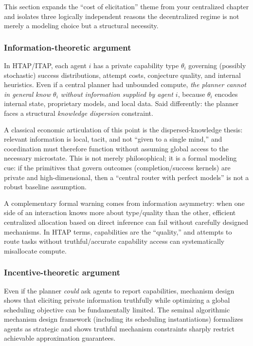 This section expands the ``cost of elicitation'' theme from your centralized chapter and isolates three logically independent reasons the decentralized regime is not merely a modeling choice but a structural necessity.

\subsubsection{Information-theoretic argument}

In HTAP/ITAP, each agent \(i\) has a private capability type \(\theta_i\) governing (possibly stochastic) success distributions, attempt costs, conjecture quality, and internal heuristics. Even if a central planner had unbounded compute, \emph{the planner cannot in general know \(\theta_i\) without information supplied by agent \(i\)}, because \(\theta_i\) encodes internal state, proprietary models, and local data. Said differently: the planner faces a structural \emph{knowledge dispersion} constraint.

A classical economic articulation of this point is the dispersed-knowledge thesis: relevant information is local, tacit, and not ``given to a single mind,'' and coordination must therefore function without assuming global access to the necessary microstate. This is not merely philosophical; it is a formal modeling cue: if the primitives that govern outcomes (completion/success kernels) are private and high-dimensional, then a ``central router with perfect models'' is not a robust baseline assumption.

A complementary formal warning comes from information asymmetry: when one side of an interaction knows more about type/quality than the other, efficient centralized allocation based on direct inference can fail without carefully designed mechanisms. In HTAP terms, capabilities are the ``quality,'' and attempts to route tasks without truthful/accurate capability access can systematically misallocate compute.

\subsubsection{Incentive-theoretic argument}

Even if the planner \emph{could} ask agents to report capabilities, mechanism design shows that eliciting private information truthfully while optimizing a global scheduling objective can be fundamentally limited. The seminal algorithmic mechanism design framework (including its scheduling instantiations) formalizes agents as strategic and shows truthful mechanism constraints sharply restrict achievable approximation guarantees.

